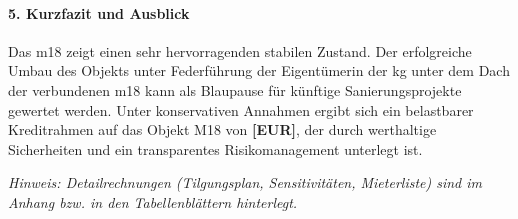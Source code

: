 \paragraph{5. Kurzfazit und Ausblick}
Das \gls{m18} zeigt einen sehr hervorragenden stabilen Zustand. Der erfolgreiche Umbau des Objekts unter Federführung der Eigentümerin der \gls{kg} unter dem Dach der verbundenen \gls{m18} kann als Blaupause für künftige Sanierungsprojekte gewertet werden.  Unter konservativen Annahmen ergibt sich ein belastbarer Kreditrahmen auf das Objekt M18 von \textbf{[EUR]}, der durch werthaltige Sicherheiten und ein transparentes Risikomanagement unterlegt ist.

\vspace{0.5em}
\textit{Hinweis: Detailrechnungen (Tilgungsplan, Sensitivitäten, Mieterliste) sind im Anhang bzw. in den Tabellenblättern hinterlegt.}

\normalsize
